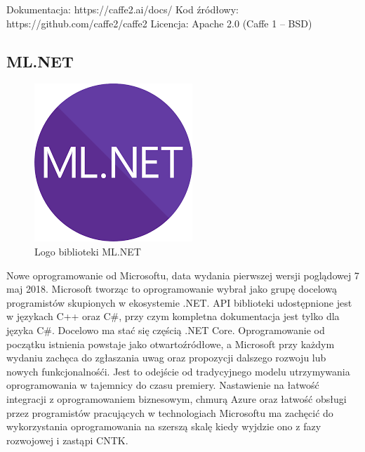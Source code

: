 \documentclass[12pt,a4paper,twoside,titlepage,openright]{book}
\begin{document}
\noindent
\newline
Dokumentacja: https://caffe2.ai/docs/
\newline
Kod źródłowy: https://github.com/caffe2/caffe2
\newline
Licencja: Apache 2.0 (Caffe 1 -- BSD)


\subsection{ML.NET}
\begin{figure}[h]
	\centering
			\includegraphics[resolution=100, scale=0.8]{ML_NET.png}
		\caption{Logo biblioteki ML.NET}
\end{figure}
Nowe oprogramowanie od Microsoftu, data wydania pierwszej wersji poglądowej 7 maj 2018. Microsoft tworząc to oprogramowanie wybrał jako grupę docelową programistów skupionych w ekosystemie .NET. API biblioteki udostępnione jest w językach C++ oraz C#, przy czym kompletna dokumentacja jest tylko dla języka C#. Docelowo ma stać się częścią .NET Core. Oprogramowanie od początku istnienia powstaje jako otwartoźródłowe, a Microsoft przy każdym wydaniu zachęca do zgłaszania uwag oraz propozycji dalszego rozwoju lub nowych funkcjonalnośći. Jest to odejście od tradycyjnego modelu utrzymywania oprogramowania w tajemnicy do czasu premiery. Nastawienie na łatwość integracji z oprogramowaniem biznesowym, chmurą Azure oraz łatwość obsługi przez programistów pracujących w technologiach Microsoftu ma zachęcić do wykorzystania oprogramowania na szerszą skalę kiedy wyjdzie ono z fazy rozwojowej i zastąpi CNTK.
\end{document}
